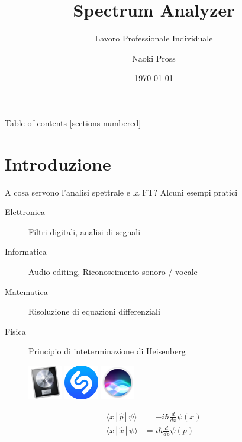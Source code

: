 \documentclass[10pt, xetex, handout]{beamer}
\title{Spectrum Analyzer}
\subtitle{Lavoro Professionale Individuale}
\date{\today}
\author{Naoki Pross}
\institute{SAM Bellinzona}
\begin{document}
\maketitle

\begin{frame}{Table of contents}
    [sections numbered]
    \tableofcontents[hideallsubsections]
\end{frame}

\section{Introduzione}
\begin{frame}{A cosa servono l'analisi spettrale e la FT?}
    \vfill
    Alcuni esempi pratici
    \begin{description}
        \item [Elettronica] Filtri digitali, analisi di segnali
        \item [Informatica] Audio editing, Riconoscimento sonoro / vocale
        \item [Matematica] Risoluzione di equazioni differenziali
        \item [Fisica] Principio di inteterminazione di Heisenberg
    \end{description}
    \vfill
    \begin{figure} \centering
        \includegraphics[height=1.5cm]{figures/logo/logic}
        \hfill
        \includegraphics[height=1.5cm]{figures/logo/shazam}
        \hfill
        \includegraphics[height=1.5cm]{figures/logo/siri}
        \hfill
        \begin{minipage}[b][1.5cm][c]{.25\linewidth}
        \begin{align*}
            \langle x\,|\,\hat p\,|\,\psi \rangle &= 
                -i\mathbf{\hbar}\frac{d}{dx} \psi(x) \\
            \langle x\,|\,\hat x\,|\,\psi \rangle &= 
                i\mathbf{\hbar}\frac{d}{dp} \psi(p) \\
        \end{align*}
        \end{minipage}
    \end{figure}
\end{frame}
\end{document}
